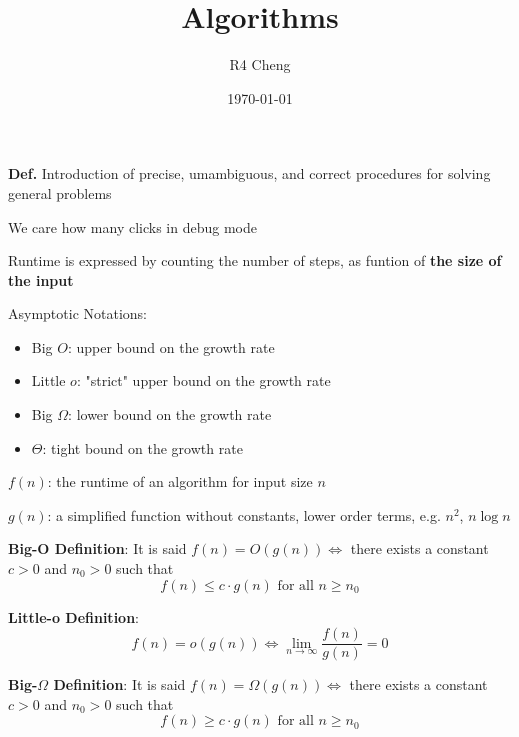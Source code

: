 \documentclass[12pt,a4paper]{article}
\title{Algorithms}
\author{R4 Cheng}
\date{\today}
\begin{document}
\maketitle

\textbf{Def.} Introduction of precise, umambiguous, and correct procedures for solving general problems

We care how many clicks in debug mode

Runtime is expressed by counting the number of steps, as funtion of \textbf{the size of the input}

Asymptotic Notations:

\begin{itemize}
  \item Big $O$: upper bound on the growth rate
  \item Little $o$: "strict" upper bound on the growth rate
  \item Big $\Omega$: lower bound on the growth rate
  \item $\Theta$: tight bound on the growth rate
\end{itemize}

$f(n)$: the runtime of an algorithm for input size $n$

$g(n)$: a simplified function without constants, lower order terms, e.g. $n^2$, $n \log n$

\textbf{Big-O Definition}: It is said $f(n) = O(g(n)) \iff$ there exists a constant $c > 0$ and $n_0 > 0$ such that
$$f(n) \leq c \cdot g(n) \text{ for all } n \geq n_0$$

\textbf{Little-o Definition}:
$$f(n) = o(g(n)) \iff \lim_{n \to \infty} \frac{f(n)}{g(n)} = 0$$

\textbf{Big-$\Omega$ Definition}: It is said $f(n) = \Omega(g(n)) \iff$ there exists a constant $c > 0$ and $n_0 > 0$ such that
$$f(n) \geq c \cdot g(n) \text{ for all } n \geq n_0$$
\end{document}
